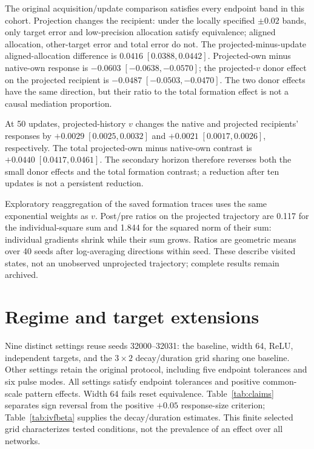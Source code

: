 The original acquisition/update comparison satisfies every endpoint band in this cohort. Projection changes the recipient: under the locally specified $\pm0.02$ bands, only target error and low-precision allocation satisfy equivalence; aligned allocation, other-target error and total error do not. The projected-minus-update aligned-allocation difference is $0.0416\;[0.0388,0.0442]$. Projected-own minus native-own response is $-0.0603\;[-0.0638,-0.0570]$; the projected-$v$ donor effect on the projected recipient is $-0.0487\;[-0.0503,-0.0470]$. The two donor effects have the same direction, but their ratio to the total formation effect is not a causal mediation proportion.

At 50 updates, projected-history $v$ changes the native and projected recipients' responses by $+0.0029\;[0.0025,0.0032]$ and $+0.0021\;[0.0017,0.0026]$, respectively. The total projected-own minus native-own contrast is $+0.0440\;[0.0417,0.0461]$. The secondary horizon therefore reverses both the small donor effects and the total formation contrast; a reduction after ten updates is not a persistent reduction.

Exploratory reaggregation of the saved formation traces uses the same exponential weights as $v$. Post/pre ratios on the projected trajectory are 0.117 for the individual-square sum and 1.844 for the squared norm of their sum: individual gradients shrink while their sum grows. Ratios are geometric means over 40 seeds after log-averaging directions within seed. These describe visited states, not an unobserved unprojected trajectory; complete results remain archived.

\section{Regime and target extensions}
\label{app:extension}
Nine distinct settings reuse seeds 32000--32031: the baseline, width 64, ReLU, independent targets, and the $3\times2$ decay/duration grid sharing one baseline. Other settings retain the original protocol, including five endpoint tolerances and six pulse modes. All settings satisfy endpoint tolerances and positive common-scale pattern effects. Width 64 fails reset equivalence. Table~\ref{tab:claims} separates sign reversal from the positive $+0.05$ response-size criterion; Table~\ref{tab:ivfbeta} supplies the decay/duration estimates. This finite selected grid characterizes tested conditions, not the prevalence of an effect over all networks.

